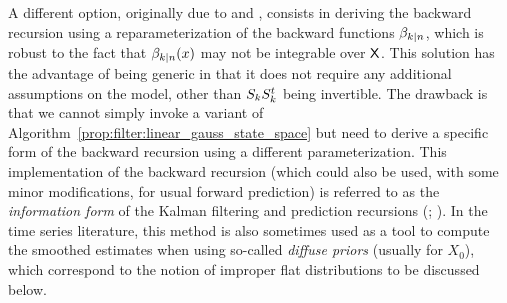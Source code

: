 A different option, originally due to \cite{mayne:1966} and
\cite{fraser:potter:1969}, consists in deriving the backward recursion using a
reparameterization of the backward functions $\beta_{k|n}$, which is robust
to the fact that $\beta_{k|n}(x)$ may not be integrable over $\mathsf{X}$. This
solution has the advantage of being generic in that it does not require any
additional assumptions on the model, other than $\VCov[k]$ being
invertible. The drawback is that we cannot simply invoke a variant of
Algorithm~\ref{prop:filter:linear_gauss_state_space} but need to derive a
specific form of the backward recursion using a different parameterization.
This implementation of the backward recursion (which could also be used, with
some minor modifications, for usual forward prediction) is referred to as the
{\em information form} of the Kalman filtering and prediction recursions
(\cite[Section~6.3]{anderson:moore:1979}; \cite[Section~9.5.2]{kailath:sayed:hassibi:2000}). 
In the time series literature, this method
is also sometimes used as a tool to compute the smoothed estimates when using
so-called  \emph{diffuse priors} (usually for $X_0$),
which correspond to the
notion of improper flat distributions to be discussed below.

